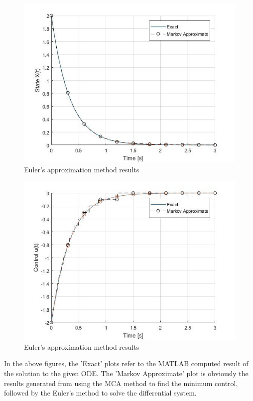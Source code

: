 \documentclass[11pt,draftd]{article}
\begin{document}
\begin{figure}[H]
	\centering
	\label{eulersmethod1}
	\includegraphics[scale = 0.6]{images/EulersApproximateState}
	\caption{Euler's approximation method results}
\end{figure}
\begin{figure}[H]
	\centering
	\label{eulersmethod2}
	\includegraphics[scale = 0.6]{images/EulersApproximateControl}
	\caption{Euler's approximation method results}
\end{figure}

In the above figures, the 'Exact' plots refer to the MATLAB computed result of the solution to the given ODE. The 'Markov Approximate' plot is obviously the results generated from using the MCA method to find the minimum control, followed by the Euler's method to solve the differential system.
\end{document}
